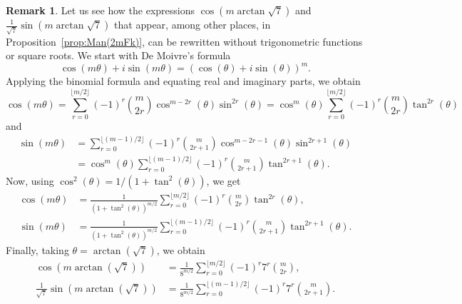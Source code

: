 \documentclass[11pt, a4paper]{article}
\theoremstyle{plain}
\theoremstyle{definition}
\newtheorem{remark}[theorem]{Remark}
\begin{document}
\begin{remark}
Let us see how the expressions $\cos(m \arctan\sqrt{7})$ and $\frac{1}{\sqrt{7}} \sin(m \arctan\sqrt{7})$ that appear, among other places, in Proposition~\ref{prop:Man(2mFk)}, can be rewritten without trigonometric functions or square roots. We start with De Moivre's formula
\[
\cos (m\theta) + i \sin(m\theta) = (\cos(\theta) + i \sin(\theta))^{m}.
\]
Applying the binomial formula and equating real and imaginary parts, we obtain
\[
  \cos (m \theta) = \sum_{r=0}^{\lfloor m/2\rfloor} (-1)^{r} 
  \binom{m}{2r} \cos^{m-2r}(\theta) \sin^{2r}(\theta)
  = \cos^{m}(\theta) \sum_{r=0}^{\lfloor m/2\rfloor} (-1)^{r} 
  \binom{m}{2r} \tan^{2r}(\theta)
\]
and
\begin{align*}
  \sin(m \theta) &= \sum_{r=0}^{\lfloor(m-1)/2\rfloor} (-1)^{r} 
  \binom{m}{2r+1} \cos^{m-2r-1}(\theta) \sin^{2r+1}(\theta)
  \\&= \cos^{m}(\theta) \sum_{r=0}^{\lfloor(m-1)/2\rfloor} (-1)^{r} 
  \binom{m}{2r+1} \tan^{2r+1}(\theta).
\end{align*}
Now, using $\cos^2(\theta) = 1/(1+\tan^2(\theta))$, we get
\begin{align*}
  \cos (m \theta) &= \frac{1}{(1+\tan^{2}(\theta))^{m/2}} 
  \sum_{r=0}^{\lfloor m/2\rfloor} (-1)^{r} 
  \binom{m}{2r} \tan^{2r}(\theta),
\\
  \sin(m \theta) &= \frac{1}{(1+\tan^{2}(\theta))^{m/2}} 
  \sum_{r=0}^{\lfloor(m-1)/2\rfloor} (-1)^{r} 
  \binom{m}{2r+1} \tan^{2r+1}(\theta).
\end{align*}
Finally, taking $\theta = \arctan(\sqrt{7})$, we obtain
\begin{equation}
\label{eq:sqrt7}
\begin{aligned}
  \cos (m \arctan(\sqrt{7})) &= \frac{1}{8^{m/2}}
  \sum_{r=0}^{\lfloor m/2\rfloor} (-1)^{r} 7^r \binom{m}{2r},
\\
  \frac{1}{\sqrt{7}} \sin(m \arctan(\sqrt{7})) &= \frac{1}{8^{m/2}}
  \sum_{r=0}^{\lfloor(m-1)/2\rfloor} (-1)^{r} 7^r \binom{m}{2r+1}.
\end{aligned}
\end{equation}
\end{remark}
\end{document}
